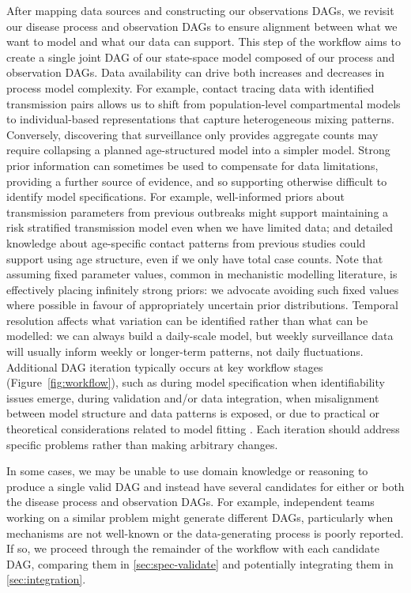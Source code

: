 \documentclass{article}
\begin{document}
After mapping data sources and constructing our observations \ac{DAG}s, we revisit our disease process and observation \ac{DAG}s to ensure alignment between what we want to model and what our data can support.
This step of the workflow aims to create a single joint \ac{DAG} of our state-space model composed of our process and observation \ac{DAG}s.
Data availability can drive both increases and decreases in process model complexity.
For example, contact tracing data with identified transmission pairs allows us to shift from population-level compartmental models to individual-based representations that capture heterogeneous mixing patterns.
Conversely, discovering that surveillance only provides aggregate counts may require collapsing a planned age-structured model into a simpler model.
Strong prior information can sometimes be used to compensate for data limitations, providing a further source of evidence, and so supporting otherwise difficult to identify model specifications.
For example, well-informed priors about transmission parameters from previous outbreaks might support maintaining a risk stratified transmission model even when we have limited data; and detailed knowledge about age-specific contact patterns from previous studies could support using age structure, even if we only have total case counts.
Note that assuming fixed parameter values, common in mechanistic modelling literature, is effectively placing infinitely strong priors: we advocate avoiding such fixed values where possible in favour of appropriately uncertain prior distributions.
Temporal resolution affects what variation can be identified rather than what can be modelled: we can always build a daily-scale model, but weekly surveillance data will usually inform weekly or longer-term patterns, not daily fluctuations.
Additional \ac{DAG} iteration typically occurs at key workflow stages (Figure~\ref{fig:workflow}), such as during model specification when identifiability issues emerge, during validation and/or data integration, when misalignment between model structure and data patterns is exposed, or due to practical or theoretical considerations related to model fitting \citep{corbella2022inferring}.
Each iteration should address specific problems rather than making arbitrary changes.

In some cases, we may be unable to use domain knowledge or reasoning to produce a single valid DAG and instead have several candidates for either or both the disease process and observation \ac{DAG}s. For example, independent teams working on a similar problem might generate different \ac{DAG}s, particularly when mechanisms are not well-known or the data-generating process is poorly reported. If so, we proceed through the remainder of the workflow with each candidate \ac{DAG}, comparing them in \ref{sec:spec-validate} and potentially integrating them in \ref{sec:integration}.
\end{document}
